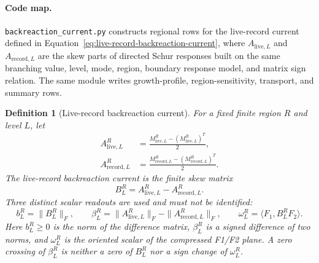 \documentclass[11pt]{article}
\newtheorem{definition}{Definition}[section]
\theoremstyle{remark}
\newcommand{\code}[1]{\texttt{#1}}
\numberwithin{equation}{section}
\begin{document}
\paragraph{Code map.} \code{backreaction\_\allowbreak{}current.py} constructs regional rows for the live-record current defined in Equation~\eqref{eq:live-record-backreaction-current}, where $A_{\mathrm{live},L}$ and $A_{\mathrm{record},L}$ are the skew parts of directed Schur responses built on the same branching value, level, mode, region, boundary response model, and matrix sign relation. The same module writes growth-profile, region-sensitivity, transport, and summary rows.

\begin{definition}[Live-record backreaction current]
For a fixed finite region $R$ and level $L$, let
\begin{equation}
\begin{aligned}
  A^{R}_{\mathrm{live},L}&=\frac{M^{R}_{\mathrm{live},L}-(M^{R}_{\mathrm{live},L})^T}{2},\\
  A^{R}_{\mathrm{record},L}&=\frac{M^{R}_{\mathrm{record},L}-(M^{R}_{\mathrm{record},L})^T}{2}.
\end{aligned}
\label{eq:live-record-skew-parts}
\end{equation}
The live-record backreaction current is the finite skew matrix
\begin{equation}
  B^{R}_L=A^{R}_{\mathrm{live},L}-A^{R}_{\mathrm{record},L}.
  \label{eq:live-record-backreaction-current}
\end{equation}
Three distinct scalar readouts are used and must not be identified:
\begin{equation}
  b_L^R=\|B_L^R\|_F,\qquad
  \beta_L^R=\|A^{R}_{\mathrm{live},L}\|_F-\|A^{R}_{\mathrm{record},L}\|_F,\qquad
  \omega_L^R=\langle F_1,B_L^R F_2\rangle.
  \label{eq:backreaction-scalar-readouts}
\end{equation}
Here \(b_L^R\ge0\) is the norm of the difference matrix, \(\beta_L^R\) is a signed difference of two norms, and \(\omega_L^R\) is the oriented scalar of the compressed F1/F2 plane. A zero crossing of \(\beta_L^R\) is neither a zero of \(B_L^R\) nor a sign change of \(\omega_L^R\).
\end{definition}
\end{document}
